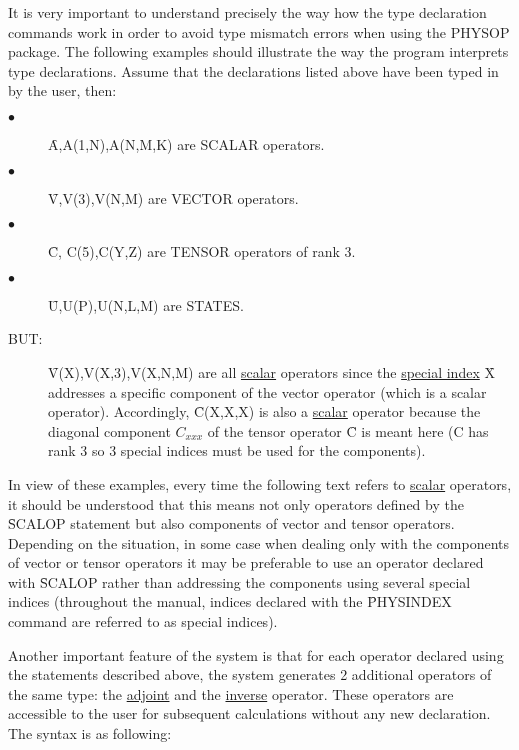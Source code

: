 It is very important to understand precisely the way how the type
declaration commands work in order to avoid type mismatch errors when
using the PHYSOP package. The following examples should illustrate the
way the program interprets type declarations.
Assume that the declarations listed above have
been typed in by the user, then:
\begin{description}
\item[$\bullet$] \f{A,A(1,N),A(N,M,K)} are SCALAR operators.
\item[$\bullet$] \f{V,V(3),V(N,M)} are VECTOR operators.
\item[$\bullet$] \f{C, C(5),C(Y,Z)} are TENSOR operators of
rank 3.
\item[$\bullet$] \f{U,U(P),U(N,L,M)} are  STATES.
\item[BUT:] \f{V(X),V(X,3),V(X,N,M)} are all \underline{scalar}
operators
since the \underline{special index} \f{X}  addresses a
specific component
of the vector operator (which is a scalar operator). Accordingly,
\f{C(X,X,X)} is  also a \underline{scalar} operator because
the diagonal component $C_{xxx}$
of the tensor operator \f{C} is meant here
(C has rank 3 so 3 special indices must be used for the components).
\end{description}

In view of these examples, every time the following text
refers to \underline{scalar} operators,
it should be understood that this means not only operators defined by
the
\f{SCALOP} statement but also components of vector and tensor operators.
Depending on the situation, in some case when dealing only with the
components of vector or tensor operators it may be preferable to use
an operator declared with \f{SCALOP} rather than addressing  the
components using several special indices (throughout the
manual,
indices declared with the \f{PHYSINDEX} command are referred to as special
indices).

Another important feature of the system  is that
for each operator declared using the statements described above, the
system generates 2 additional operators of the same type:
the \underline{adjoint} and the \underline{inverse} operator.
These operators are accessible to the user for subsequent calculations
without any new declaration.  The syntax is as following:


